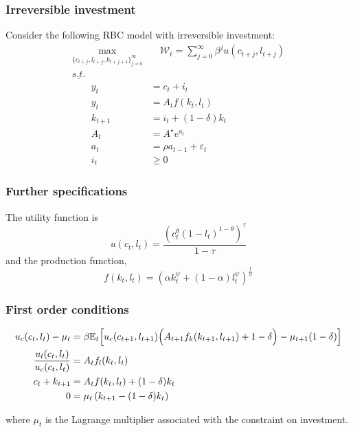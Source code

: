 \documentclass{beamer}
\begin{document}
\begin{frame}
   \frametitle{Irreversible investment}
   Consider the following RBC model with irreversible investment:
   \[
      \begin{split}
         \max_{\{c_{t+j},l_{t+j},k_{t+j+1}\}_{j=0}^{\infty}} & \quad \mathcal W_t = \sum_{j=0}^{\infty}\beta^ju(c_{t+j},l_{t+j}) \\
         \underline{s.t.}                                    &                                                                   \\
         \qquad y_t                                          & = c_t + i_t                                                       \\
         \qquad y_t                                          & = A_tf(k_{t},l_t)                                                 \\
         \qquad k_{t+1}                                      & = i_t + (1-\delta)k_{t}                                           \\
         \qquad A_{t}                                        & = {A^{\star}}e^{a_{t}}                                            \\
         \qquad a_{t}                                        & = \rho a_{t-1} + \varepsilon_t                                    \\
         \qquad i_t                                          & \ge 0
      \end{split}
   \]
\end{frame}

\begin{frame}
   \frametitle{Further specifications}
   The utility function is
   \[
      u(c_t,l_t) = \frac{\left(c_t^{\theta}(1-l_t)^{1-\theta}\right)^{\tau}}{1-\tau}
   \]
   and the production function,
   \[
      f(k_{t},l_t) = \left(\alpha k_{t}^{\psi} + (1-\alpha)l_t^{\psi}\right)^{\frac{1}{\psi}}
   \]
\end{frame}

\begin{frame}
   \frametitle{First order conditions}
   {\footnotesize\[
         \begin{split}
            u_c(c_t,l_t) - \mu_t                & = \beta \mathbb E_t\Big[
            u_c(c_{t+1},l_{t+1})\Bigl(A_{t+1}f_k(k_{t+1},l_{t+1}) + 1
            -\delta\Bigr) - \mu_{t+1}(1-\delta)\Big]                                               \\
            \frac{u_{l}(c_t,l_t)}{u_c(c_t,l_t)} & = A_tf_l(k_t,l_t)                                \\
            c_t + k_{t+1}                       & = A_tf(k_{t},l_t) + (1-\delta)k_{t}              \\
            0                                   & = \mu_t \left( k_{t+1} - (1-\delta)k_{t} \right)
         \end{split}
      \]}

   \bigskip\bigskip

   where $\mu_t$ is the Lagrange multiplier associated with the constraint on investment.
\end{frame}
\end{document}
